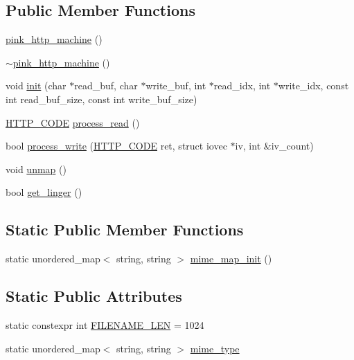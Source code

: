 \subsection*{Public Member Functions}
\begin{DoxyCompactItemize}
\item 
\hyperlink{classpink__http__machine_a8f5a3d6283cb4e9237cf1deb01548826}{pink\+\_\+http\+\_\+machine} ()
\item 
\hyperlink{classpink__http__machine_a38d1d6228955fc97c752d330d4c126c2}{$\sim$pink\+\_\+http\+\_\+machine} ()
\item 
void \hyperlink{classpink__http__machine_a32b0ee47de1b90467d17194fa83b4eb0}{init} (char $\ast$read\+\_\+buf, char $\ast$write\+\_\+buf, int $\ast$read\+\_\+idx, int $\ast$write\+\_\+idx, const int read\+\_\+buf\+\_\+size, const int write\+\_\+buf\+\_\+size)
\item 
\hyperlink{classpink__http__machine_afb1e590cd61676c2f8859c4e01e5b150}{H\+T\+T\+P\+\_\+\+C\+O\+DE} \hyperlink{classpink__http__machine_a7c937bd8da6bdfbf4894e6af9a712d60}{process\+\_\+read} ()
\item 
bool \hyperlink{classpink__http__machine_a7144e4279cd09ab8ce56873bd3906f24}{process\+\_\+write} (\hyperlink{classpink__http__machine_afb1e590cd61676c2f8859c4e01e5b150}{H\+T\+T\+P\+\_\+\+C\+O\+DE} ret, struct iovec $\ast$iv, int \&iv\+\_\+count)
\item 
void \hyperlink{classpink__http__machine_a26debab8c361df5c79966f11e2b2dd17}{unmap} ()
\item 
bool \hyperlink{classpink__http__machine_a01dcf59a537c21d5a4a92c1c25fbf3ab}{get\+\_\+linger} ()
\end{DoxyCompactItemize}
\subsection*{Static Public Member Functions}
\begin{DoxyCompactItemize}
\item 
static unordered\+\_\+map$<$ string, string $>$ \hyperlink{classpink__http__machine_ad6d404392628f4b2c94a4b30fefb62f8}{mime\+\_\+map\+\_\+init} ()
\end{DoxyCompactItemize}
\subsection*{Static Public Attributes}
\begin{DoxyCompactItemize}
\item 
static constexpr int \hyperlink{classpink__http__machine_a33993ee83910b37ae5672c6e6c94cac3}{F\+I\+L\+E\+N\+A\+M\+E\+\_\+\+L\+EN} = 1024
\item 
static unordered\+\_\+map$<$ string, string $>$ \hyperlink{classpink__http__machine_a4373363c5bd675e182f502d300157aa9}{mime\+\_\+type}
\end{DoxyCompactItemize}


